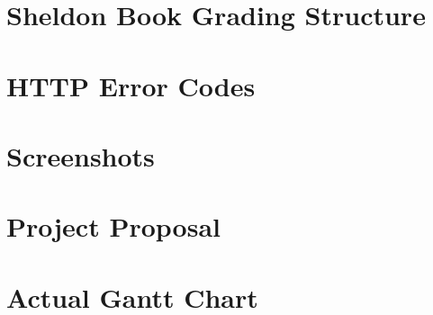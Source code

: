 \begin{appendices}

\chapter{Sheldon Book Grading Structure}



















\chapter{HTTP Error Codes}

\chapter{Screenshots}

\chapter{Project Proposal}

\chapter{Actual Gantt Chart}

\end{appendices}